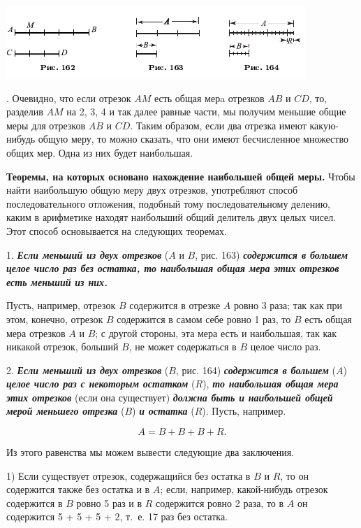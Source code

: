 \documentclass[oneside]{book}
\begin{document}
\includegraphics{pics/ris-162-164}

.
Очевидно, что если отрезок $AM$ есть общая мерa
отрезков $AB$ и $CD$, то, разделив $AM$ на 2, 3, 4 и так далее равные
части, мы получим меньшие общие меры для отрезков $AB$ и $CD$.
Таким образом, если два отрезка имеют какую-нибудь общую меру, то можно сказать, что они имеют бесчисленное множество общих мер.
Одна из них будет наибольшая.

\textbf{Теоремы, на которых основано нахождение наибольшей общей меры.}
Чтобы найти наибольшую общую меру двух отрезков, употребляют способ последовательного отложения, подобный тому последовательному делению, каким в арифметике находят наибольший общий делитель двух целых чисел.
Этот способ основывается на следующих теоремах.

1.
\textbf{\emph{Если меньший из двух отрезков}} ($A$ и $B$, рис. 163) \textbf{\emph{содержится в большем целое число раз без остатка, то наибольшая общая мера этих отрезков есть меньший из них.}}

Пусть, например, отрезок $B$ содержится в отрезке $A$ ровно 3 раза;
так как при этом, конечно, отрезок $B$ содержится в самом себе ровно 1 раз, то $B$ есть общая мера отрезков $A$ и $B$;
с другой стороны, эта мера есть и наибольшая, так как никакой отрезок, больший $B$, не может содержаться в $B$ целое число раз.

2.
\textbf{\emph{Если меньший из двух отрезков}} ($B$, рис. 164) \textbf{\emph{содержится в большем}} ($A$) \textbf{\emph{целое число раз с некоторым остатком}} ($R$), \textbf{\emph{то наибольшая общая мера этих отрезков}} (если она существует) \textbf{\emph{должна быть и наибольшей общей мерой меньшего отрезка}} ($B$) \textbf{\emph{и остатка}} ($R$).
Пусть, например.

\[A=B+B+B + R.\]

Из этого равенства мы можем вывести следующие два заключения.

1) Если существует отрезок, содержащийся без остатка в $B$ и $R$, то он содержится также без остатка и в $A$;
если, например, какой-нибудь отрезок содержится в $B$ ровно 5 раз и в $R$ содержится ровно 2 раза, то в $A$ он содержится 5 + 5 + 5 + 2, т.~е. 17 раз без остатка.
\end{document}
